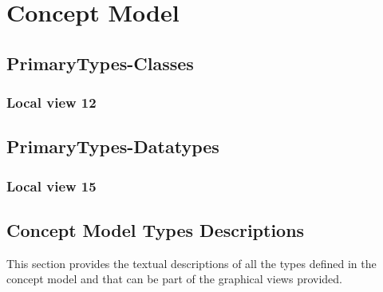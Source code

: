 
\chapter{Concept Model}
\label{chap:lu.uni.lassy.excalibur.group09.spec-CM}


\section{PrimaryTypes-Classes}
\subsection{Local view 12}
\label{sec:lu.uni.lassy.excalibur.group09.spec-CM-view-local-PrimaryTypes-Classes-12}




\section{PrimaryTypes-Datatypes}
\subsection{Local view 15}
\label{sec:lu.uni.lassy.excalibur.group09.spec-CM-view-local-PrimaryTypes-Datatypes-15}










\section{Concept Model Types Descriptions}
This section provides the textual descriptions of all the types defined in the concept model and that can be part of the graphical views provided.












